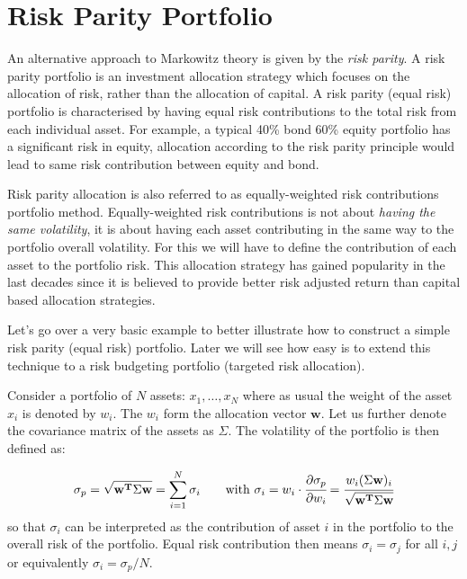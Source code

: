 \section{Risk Parity Portfolio}\label{risk-parity-portfolio}

An alternative approach to Markowitz theory is given by the
\emph{risk parity}. A risk parity portfolio is an investment allocation
strategy which focuses on the allocation of risk, rather than the
allocation of capital. A risk parity (equal risk) portfolio is
characterised by having equal risk contributions to the total risk from
each individual asset. For example, a typical 40\% bond 60\% equity
portfolio has a significant risk in equity, allocation according to the
risk parity principle would lead to same risk contribution between
equity and bond.

Risk parity allocation is also referred to as equally-weighted risk
contributions portfolio method. Equally-weighted risk contributions is
not about \emph{having the same volatility}, it is about having each
asset contributing in the same way to the portfolio overall volatility.
For this we will have to define the contribution of each asset to the
portfolio risk. This allocation strategy has gained popularity in the
last decades since it is believed to provide better risk adjusted return
than capital based allocation strategies.

Let's go over a very basic example to better illustrate how to construct
a simple risk parity (equal risk) portfolio. Later we will see how easy
is to extend this technique to a risk budgeting portfolio (targeted risk
allocation).

Consider a portfolio of \(N\) assets: \(x_{1}, \ldots, x_N\) where as
usual the weight of the asset \(x_{i}\) is denoted by \(w_{i}\). The
\(w_{i}\) form the allocation vector \(\mathbf{w}\). Let us further
denote the covariance matrix of the assets as \(\Sigma\). The volatility
of the portfolio is then defined as:

\[ \sigma_p={\sqrt {\mathbf{w^T}\Sigma \mathbf{w}}} = \sum _{i=1}^{N}\sigma _{i}\qquad\textrm{with}~\sigma _{i} = w_{i}\cdot \cfrac{\partial\sigma_p}{\partial w_{i}}={\cfrac {w_{i}(\Sigma \mathbf{w})_{i}}{\sqrt {\mathbf{w^T}\Sigma \mathbf{w}}}}\]
so that \(\sigma _{i}\) can be interpreted as the contribution of asset
\(i\) in the portfolio to the overall risk of the portfolio.
Equal risk contribution then means \(\sigma _{i} =\sigma _{j}\) for all
\(i,j\) or equivalently \(\sigma _{i}=\sigma_p/N\).

